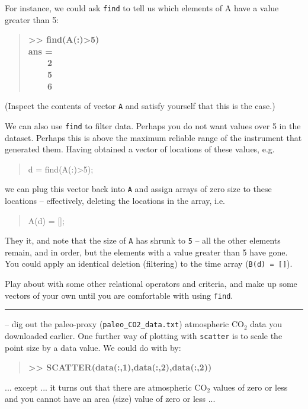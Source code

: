 \documentclass{tufte-book} %
\newenvironment{docspec}{\begin{quotation}\ttfamily\parskip0pt\parindent0pt\ignorespaces}{\end{quotation}}
\newenvironment{docspecbold}{\begin{quotation}\ttfamily\bfseries\parskip0pt\parindent0pt\ignorespaces}{\end{quotation}}
\begin{document}
For instance, we could ask \texttt{find} to tell us which elements of A have a value greater than 5:
\begin{docspecbold}
>> find(A(:)>5)
\\ ans =
\\ \ \ \ \ 2
\\ \ \ \ \ 5
\\ \ \ \ \ 6
\end{docspecbold}
(Inspect the contents of vector \texttt{A} and satisfy yourself that this is the case.)

We can also use \texttt{find} to filter data. Perhaps you do not want values over 5 in the dataset. Perhaps this is above the maximum reliable range of the instrument that generated them. Having obtained a vector of locations of these values, e.g.
\begin{docspec}
d = find(A(:)>5);
\end{docspec}
we can plug this vector back into \texttt{A} and assign arrays of zero size to these locations -- effectively, deleting the locations in the array, i.e.
\begin{docspec}
A(d) = [];
\end{docspec}
They it, and note that the size of \texttt{A} has shrunk to \texttt{5} -- all the other elements remain, and in order, but the elements with a value greater than 5 have gone. You could apply an identical deletion (filtering) to the time array (\texttt{B(d) = []}).

Play about with some other relational operators and criteria, and make up some vectors of your own until you are comfortable with using \texttt{find}. 

\vspace{1mm}
\noindent\rule{4cm}{0.5pt}
\vspace{-2mm}


 -- dig out the paleo-proxy (\texttt{paleo\_CO2\_data.txt}) atmospheric CO\(_{2}\) data you downloaded earlier. One further way of plotting with \texttt{scatter} is to scale the point size by a data value. We could do with by:
\begin{docspecbold}
>> SCATTER(data(:,1),data(:,2),data(:,2))
\end{docspecbold}
... except ... it turns out that there are atmospheric CO\(_{2}\) values of zero or less and you cannot have an area (size) value of zero or less ...
\end{document}
